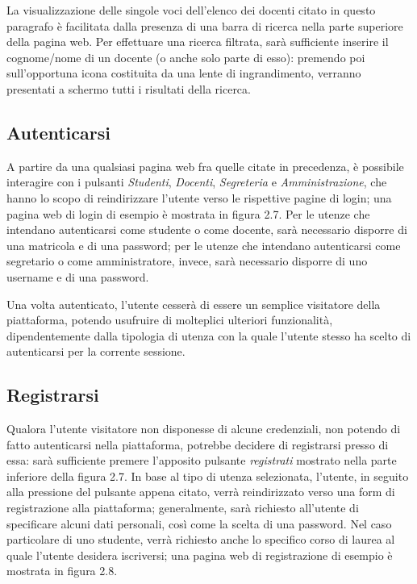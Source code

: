 \documentclass [a4paper,11pt]{book}
\begin{document}

La visualizzazione delle singole voci dell'elenco dei docenti citato in questo paragrafo è facilitata dalla presenza di una barra di ricerca nella parte superiore della pagina web. Per effettuare una ricerca filtrata, sarà sufficiente inserire il cognome/nome di un docente (o anche solo parte di esso): premendo poi sull'opportuna icona costituita da una lente di ingrandimento, verranno presentati a schermo tutti i risultati della ricerca.

\medskip

\subsection{Autenticarsi}

A partire da una qualsiasi pagina web fra quelle citate in precedenza, è possibile interagire con i pulsanti \emph{Studenti}, \emph{Docenti}, \emph{Segreteria} e \emph{Amministrazione}, che hanno lo scopo di reindirizzare l'utente verso le rispettive pagine di login; una pagina web di login di esempio è mostrata in figura 2.7. Per le utenze che intendano autenticarsi come studente o come docente, sarà necessario disporre di una matricola e di una password; per le utenze che intendano autenticarsi come segretario o come amministratore, invece, sarà necessario disporre di uno username e di una password.


Una volta autenticato, l'utente cesserà di essere un semplice visitatore della piattaforma, potendo usufruire di molteplici ulteriori funzionalità, dipendentemente dalla tipologia di utenza con la quale l'utente stesso ha scelto di autenticarsi per la corrente sessione.

\medskip

\subsection{Registrarsi}

Qualora l'utente visitatore non disponesse di alcune credenziali, non potendo di fatto autenticarsi nella piattaforma, potrebbe decidere di registrarsi presso di essa: sarà sufficiente premere l'apposito pulsante \emph{registrati} mostrato nella parte inferiore della figura 2.7. In base al tipo di utenza selezionata, l'utente, in seguito alla pressione del pulsante appena citato, verrà reindirizzato verso una form di registrazione alla piattaforma; generalmente, sarà richiesto all'utente di specificare alcuni dati personali, così come la scelta di una password. Nel caso particolare di uno studente, verrà richiesto anche lo specifico corso di laurea al quale l'utente desidera iscriversi; una pagina web di registrazione di esempio è mostrata in figura 2.8.
\end{document}

